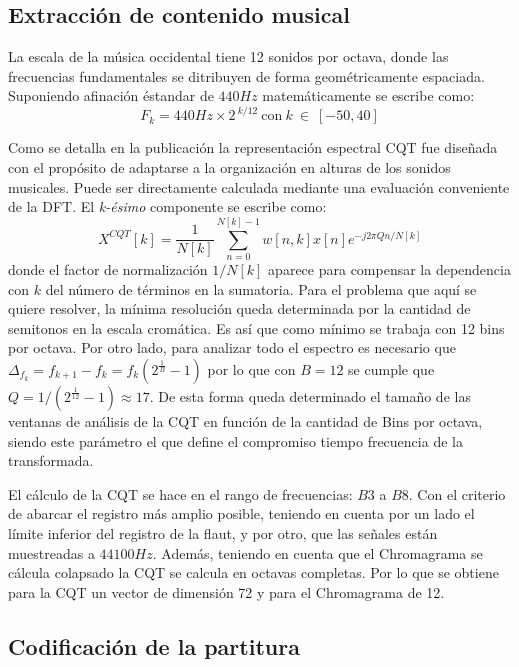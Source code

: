\documentclass
  [ams,pdfout]%
	{aeslac}
\begin{document}
\subsection{Extracción de contenido musical}
La escala de la música occidental tiene 12 sonidos por octava, donde las frecuencias fundamentales se ditribuyen de forma geométricamente espaciada. Suponiendo afinación éstandar de $440Hz$ matemáticamente se escribe como:
\begin{equation}
\label{eq:escalaTI}
F_k= 440Hz \times 2^{\:k/12} \: \text{con} \: k \: \in \: [-50,40]
\end{equation}

Como se detalla en la publicación \cite{brown1991calculation} la representación espectral CQT fue diseñada con el propósito de adaptarse a la organización en alturas de los sonidos musicales. Puede ser directamente calculada mediante una evaluación conveniente de la DFT. El \textit{k-ésimo} componente se escribe como: 
\begin{equation}
\label{eq:CQT}
X^{CQT}[k]=\frac{1}{N[k]}\sum_{n=0}^{N[k]-1}w[n,k]x[n]e^{-j2\pi Qn/N[k]}
\end{equation}
donde el factor de normalización $1/N[k]$ aparece para compensar la dependencia con $k$ del número de términos en la sumatoria. Para el problema que aquí se quiere resolver, la mínima resolución queda determinada por la cantidad de semitonos en la escala cromática. Es así que como mínimo se trabaja con 12 bins por octava. Por otro lado, para analizar todo el espectro es necesario que $\Delta_{f_k}=f_{k+1}-f_{k}=f_k(2^{\frac{1}{B}}-1)$ por lo que con $B=12$ se cumple que $Q=1/(2^{\frac{1}{12}}-1)\approx 17$. De esta forma queda determinado el tamaño de las ventanas de análisis de la CQT en función de la cantidad de Bins por octava, siendo este parámetro el que define el compromiso tiempo frecuencia de la transformada. 
 
El cálculo de la CQT se hace en el rango de frecuencias: $B3$ a $B8$. Con el criterio de abarcar el registro más amplio posible, teniendo en cuenta por un lado el límite inferior del registro de la flaut, y por otro, que las señales están muestreadas a $44100Hz$. Además, teniendo en cuenta que el Chromagrama se cálcula colapsado la CQT se calcula en octavas completas. Por lo que se obtiene para la CQT un vector de dimensión 72 y para el Chromagrama de 12.

\subsection{Codificación de la partitura}
\end{document}
